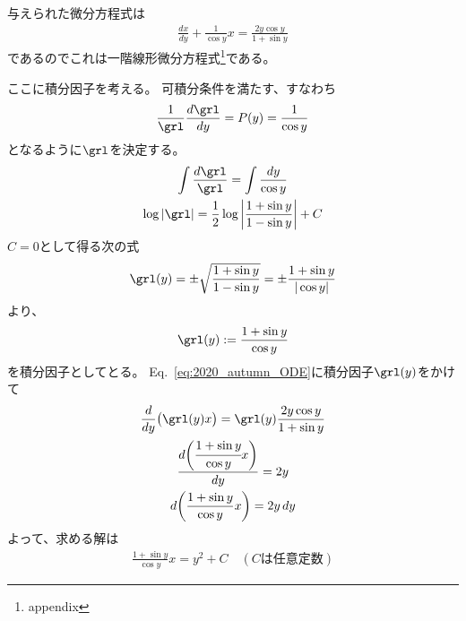 
\begin{ans*}
  与えられた微分方程式は
  \begin{gather}
    \frac{dx}{dy} + \frac{1}{\cos y} x = \frac{2y\cos y}{1+\sin y} \label{eq:2020_autumn_ODE}
  \end{gather}
  であるのでこれは一階線形微分方程式\footnote{appendix}である。

  ここに積分因子を考える。
  可積分条件を満たす、すなわち
  \begin{gather}
    \frac{1}{\grl}\frac{d\grl}{dy} = P(y) = \frac{1}{\cos y}
  \end{gather}
  となるように$\grl$を決定する。
  \begin{gather}
    \int \frac{d\grl}{\grl} = \int\frac{dy}{\cos y} \\
    \log |\grl| = \frac{1}{2}\log\left| \frac{1+\sin y}{1-\sin y} \right| + C
  \end{gather}
  $C=0$として得る次の式
  \begin{gather}
    \grl(y) = \pm\sqrt{\frac{1+\sin y}{1-\sin y}} = \pm\frac{1+\sin y}{|\cos y|}
  \end{gather}
  より、
  \begin{gather}
    \grl(y) := \frac{1+\sin y}{\cos y}
  \end{gather}
  を積分因子としてとる。
  Eq.~\eqref{eq:2020_autumn_ODE}に積分因子$\grl(y)$をかけて
  \begin{gather}
    \frac{d}{dy}\bigl(\grl(y)x\bigr) = \grl(y)\frac{2y\cos y}{1+\sin y} \\
    \frac{d\biggl(\cfrac{1+\sin y}{\cos y}x\biggr)}{dy} = 2y \\
    d\biggl(\frac{1+\sin y}{\cos y}x\biggr) = 2y\,dy
  \end{gather}
  よって、求める解は
  \begin{gather}
    \frac{1+\sin y}{\cos y}x = y^2 + C \quad(\text{$C$は任意定数})
  \end{gather}
\end{ans*}

